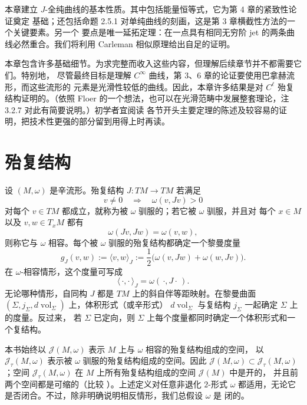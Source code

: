 
本章建立 $J$-全纯曲线的基本性质。其中包括能量恒等式，它为第 4 章的紧致性论证奠定
基础；还包括命题 2.5.1 对单纯曲线的刻画，这是第 3 章横截性方法的一个关键要素。另一个
要点是唯一延拓定理：在一点具有相同无穷阶 jet 的两条曲线必然重合。我们将利用 Carleman
相似原理给出自足的证明。

本章包含许多基础细节。为求完整而收入这些内容，但理解后续章节并不都需要它们。特别地，
尽管最终目标是理解 $C^\infty$ 曲线，第 3、6 章的论证要使用巴拿赫流形，而这些流形的
元素是光滑性较低的曲线。因此，本章许多结果是对 $C^\ell$ 殆复结构证明的。（依照 Floer
的一个想法，也可以在光滑范畴中发展整套理论，注 3.2.7 对此有简要说明。）初学者宜阅读
各节开头主要定理的陈述及较容易的证明，把技术性更强的部分留到用得上时再读。

\section{殆复结构}\label{sec:2-1}

设 $(M,\omega)$ 是辛流形。殆复结构 $J:TM\to TM$ 若满足
\[
  v\ne0\quad\Longrightarrow\quad\omega(v,Jv)>0
\]
对每个 $v\in TM$ 都成立，就称为被 $\omega$ 驯服的；若它被 $\omega$ 驯服，并且对
每个 $x\in M$ 以及 $v,w\in T_xM$ 都有
\[
  \omega(Jv,Jw)=\omega(v,w),
\]
则称它与 $\omega$ 相容。每个被 $\omega$ 驯服的殆复结构都确定一个黎曼度量
\begin{equation}\label{eq:2-1-1}
  g_J(v,w):=\langle v,w\rangle_J
  :=\frac12\bigl(\omega(v,Jw)+\omega(w,Jv)\bigr).
\end{equation}
在 $\omega$-相容情形，这个度量可写成
\[
  \langle\,\cdot,\cdot\,\rangle_J=\omega(\,\cdot,J\cdot\,).
\]
无论哪种情形，自同构 $J$ 都是 $TM$ 上的斜自伴等距映射。在黎曼曲面
$(\Sigma,j_\Sigma,d\operatorname{vol}_\Sigma)$ 上，体积形式（或辛形式）
$d\operatorname{vol}_\Sigma$ 与复结构 $j_\Sigma$ 一起确定 $\Sigma$ 上的度量。反过来，
若 $\Sigma$ 已定向，则 $\Sigma$ 上每个度量都同时确定一个体积形式和一个复结构。

本书始终以 $\mathcal J(M,\omega)$ 表示 $M$ 上与 $\omega$ 相容的殆复结构组成的空间，
以 $\mathcal J_\tau(M,\omega)$ 表示被 $\omega$ 驯服的殆复结构组成的空间。因此
$\mathcal J(M,\omega)\subset\mathcal J_\tau(M,\omega)$；空间
$\mathcal J_\tau(M,\omega)$ 在 $M$ 上所有殆复结构组成的空间 $\mathcal J(M)$ 中是开的，
并且前两个空间都是可缩的（比较 ）。上述定义对任意非退化 $2$-形式
$\omega$ 都适用，无论它是否闭合。不过，除非明确说明相反情形，我们总假设 $\omega$ 是
闭的。

